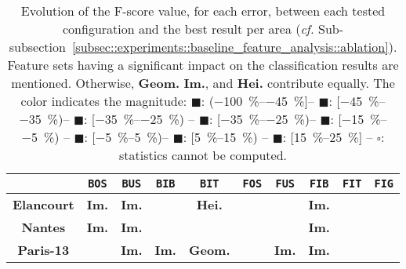         \begin{table}[htbp]
            \footnotesize 
            \centering
            \renewcommand{\arraystretch}{1.5}
            \begin{tabular}{| c | c c c c |c c c c c|}
                \hline
                & \texttt{BOS} & \texttt{BUS} & \texttt{BIB} & \texttt{BIT} & \texttt{FOS} & \texttt{FUS} & \texttt{FIB} & \texttt{FIT} & \texttt{FIG} \\
                \hline
                \textbf{Elancourt} & \cellcolor{LOSS3545} \textbf{Im.} & \cellcolor{LOSS3545} \textbf{Im.} & \cellcolor{LOSS2535} & \cellcolor{LOSS1525} \textbf{Hei.} & \cellcolor{STBL} & \cellcolor{GAIN45} & \cellcolor{GAIN2535} \textbf{Im.} & \cellcolor{LOSS1525} & \cellcolor{GAIN0515} \\
                \textbf{Nantes} & \cellcolor{STBL} \textbf{Im.} & \cellcolor{LOSS1525} \textbf{Im.} &  & \cellcolor{GAIN1525} & \cellcolor{STBL} & \cellcolor{STBL} & \cellcolor{LOSS0515} \textbf{Im.} & & \cellcolor{STBL} \\
                \textbf{Paris-13} & \cellcolor{LOSS0515} & \cellcolor{STBL} \textbf{Im.} & \cellcolor{GAIN1525} \textbf{Im.} & \cellcolor{GAIN0515} \textbf{Geom.} & \cellcolor{STBL} & \cellcolor{LOSS45} \textbf{Im.} & \cellcolor{STBL} \textbf{Im.} & \cellcolor{GAIN0515} & \cellcolor{LOSS0515} \\
                \hline
            \end{tabular}
            \renewcommand{\arraystretch}{1}
            \caption{
                \label{tab::generalization_comparison} Evolution of the F-score value, for each error, between each tested configuration and the best result per area (\textit{cf.} Sub-subsection~\ref{subsec::experiments::baseline_feature_analysis::ablation}).
                Feature sets having a significant impact on the classification results are mentioned.
                Otherwise, \textbf{Geom.} \textbf{Im.}, and \textbf{Hei.} contribute equally.
                The color indicates the magnitude:
                \textcolor{LOSS45}{$\blacksquare$}: (\SIrange[range-phrase={,  }]{-100}{-45}{\percent}]--
                \textcolor{LOSS3545}{$\blacksquare$}: [\SIrange[range-phrase={,  }]{-45}{-35}{\percent})--
                \textcolor{LOSS2535}{$\blacksquare$}: [\SIrange[range-phrase={, }]{-35}{-25}{\percent}) --
                \textcolor{LOSS1525}{$\blacksquare$}: [\SIrange[range-phrase={, }]{-35}{-25}{\percent})--
                \textcolor{LOSS0515}{$\blacksquare$}: [\SIrange[range-phrase={, }]{-15}{-5}{\percent}) --
                \textcolor{STBL}{$\blacksquare$}: [\SIrange[range-phrase={, }]{-5}{5}{\percent})--
                \textcolor{GAIN0515}{$\blacksquare$}: [\SIrange[range-phrase={, }]{5}{15}{\percent}) --
                \textcolor{GAIN1525}{$\blacksquare$}: [\SIrange[range-phrase={, }]{15}{25}{\percent}] --
                $\square$: statistics cannot be computed.
            }
        \end{table}
            
